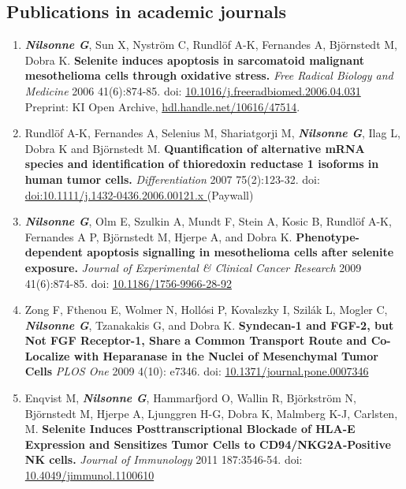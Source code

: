 \documentclass[10pt]{article}
\begin{document}
\subsection*{Publications in academic journals}
\begin{enumerate}[nolistsep]
\item \textbf{\textit{Nilsonne G}}, Sun X, Nyström C, Rundlöf A-K, Fernandes A, Björnstedt M, Dobra K. \textbf{Selenite induces apoptosis in sarcomatoid malignant mesothelioma cells through oxidative stress.} \emph{Free Radical Biology and Medicine} 2006 41(6):874-85.
doi: \href{http://dx.doi.org/10.1016/j.freeradbiomed.2006.04.031}{10.1016/j.freeradbiomed.2006.04.031} Preprint: KI Open Archive, \href{http://hdl.handle.net/10616/47514}{hdl.handle.net/10616/47514}. 
\item Rundlöf A-K, Fernandes A, Selenius M, Shariatgorji M, \textbf{\textit{Nilsonne G}}, Ilag L, Dobra K and Björnstedt M. \textbf{Quantification of alternative mRNA species and identification of thioredoxin reductase 1 isoforms in human tumor cells.} \emph{Differentiation} 2007 75(2):123-32.
doi: \href{http://dx.doi.org/doi:10.1111/j.1432-0436.2006.00121.x }{doi:10.1111/j.1432-0436.2006.00121.x } (Paywall)
\item \textbf{\textit{Nilsonne G}}, Olm E, Szulkin A, Mundt F, Stein A, Kosic B, Rundlöf A-K, Fernandes A P, Björnstedt M, Hjerpe A, and Dobra K. \textbf{Phenotype-dependent apoptosis signalling in mesothelioma cells after selenite exposure.} \emph{Journal of Experimental \& Clinical Cancer Research} 2009 41(6):874-85.
doi: \href{http://dx.doi.org/10.1186/1756-9966-28-92}{10.1186/1756-9966-28-92}
\item Zong F, Fthenou E, Wolmer N, Hollósi P, Kovalszky I, Szilák L, Mogler C, \textbf{\textit{Nilsonne G}}, Tzanakakis G, and Dobra K. \textbf{Syndecan-1 and FGF-2, but Not FGF Receptor-1, Share a Common Transport Route and Co-Localize with Heparanase in the Nuclei of Mesenchymal Tumor Cells} \emph{PLOS One} 2009 4(10): e7346.
doi: \href{http://dx.doi.org/10.1371/journal.pone.0007346}{10.1371/journal.pone.0007346}
\item Enqvist M, \textbf{\textit{Nilsonne G}}, Hammarfjord O, Wallin R, Björkström N, Björnstedt M, Hjerpe A, Ljunggren H-G, Dobra K, Malmberg K-J, Carlsten, M. \textbf{Selenite Induces Posttranscriptional Blockade of HLA-E Expression and Sensitizes Tumor Cells to CD94/NKG2A-Positive NK cells.} \emph{Journal of Immunology} 2011 187:3546-54.
doi: \href{http://dx.doi.org/10.4049/jimmunol.1100610}{10.4049/jimmunol.1100610}

\end{enumerate}
\end{document}
